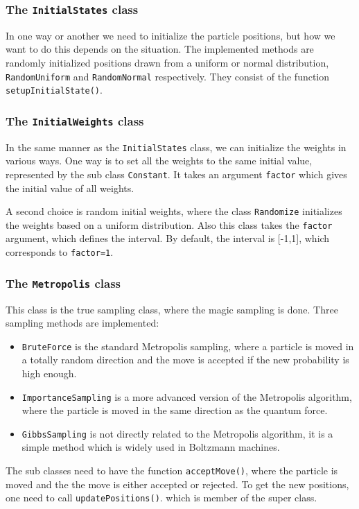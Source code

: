 \subsubsection{The \texttt{InitialStates} class}
In one way or another we need to initialize the particle positions, but how we want to do this depends on the situation. The implemented methods are randomly initialized positions drawn from a uniform or normal distribution, \texttt{RandomUniform} and \texttt{RandomNormal} respectively. They consist of the function \texttt{setupInitialState()}.

\subsubsection{The \texttt{InitialWeights} class}
In the same manner as the \texttt{InitialStates} class, we can initialize the weights in various ways. One way is to set all the weights to the same initial value, represented by the sub class \texttt{Constant}. It takes an argument \texttt{factor} which gives the initial value of all weights.

A second choice is random initial weights, where the class \texttt{Randomize} initializes the weights based on a uniform distribution. Also this class takes the \texttt{factor} argument, which defines the interval. By default, the interval is [-1,1], which corresponds to \texttt{factor=1}.

\subsubsection{The \texttt{Metropolis} class}
This class is the true sampling class, where the magic sampling is done. Three sampling methods are implemented:
\begin{itemize}
	\item \texttt{BruteForce} is the standard Metropolis sampling, where a particle is moved in a totally random direction and the move is accepted if the new probability is high enough.

	\item \texttt{ImportanceSampling} is a more advanced version of the Metropolis algorithm, where the particle is moved in the same direction as the quantum force.
	
	\item \texttt{GibbsSampling} is not directly related to the Metropolis algorithm, it is a simple method which is widely used in Boltzmann machines.
\end{itemize}
The sub classes need to have the function \texttt{acceptMove()}, where the particle is moved and the the move is either accepted or rejected. To get the new positions, one need to call \texttt{updatePositions()}. which is member of the super class. 


